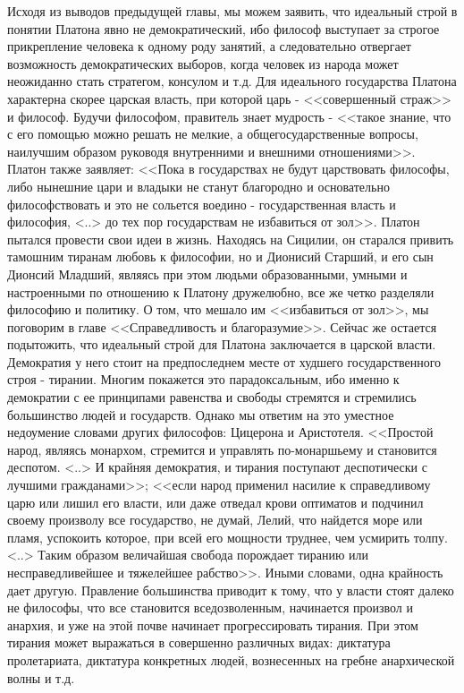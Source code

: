 	Исходя из выводов предыдущей главы, мы можем заявить, что идеальный строй 
	в понятии Платона явно не демократический, ибо философ выступает за 
	строгое прикрепление человека к одному роду занятий, а следовательно 
	отвергает возможность демократических выборов, когда человек из народа 
	может неожиданно стать стратегом, консулом и т.д. Для идеального 
	государства Платона характерна скорее царская власть, при которой 
	царь - <<совершенный страж>> и философ. Будучи философом, правитель знает 
	мудрость - <<такое знание, что с его помощью можно решать не мелкие, а 
	общегосударственные вопросы, наилучшим образом руководя внутренними и 
	внешними отношениями>>. Платон также заявляет: <<Пока в государствах не 
	будут царствовать философы, либо нынешние цари и владыки не станут 
	благородно и основательно философствовать и это не сольется воедино - 
	государственная власть и философия, <..> до тех пор государствам не 
	избавиться от зол>>. Платон пытался провести свои идеи в жизнь. 
	Находясь на Сицилии, он старался привить тамошним тиранам любовь к 
	философии, но и Дионисий Старший, и его сын Дионсий Младший, являясь 
	при этом людьми образованными, умными и настроенными по отношению к 
	Платону дружелюбно, все же четко разделяли философию и политику. О том, 
	что мешало им <<избавиться от зол>>, мы поговорим в главе <<Справедливость 
	и благоразумие>>. Сейчас же остается подытожить, что идеальный строй для 
	Платона заключается в царской власти. Демократия у него стоит на 
	предпоследнем месте от худшего государственного строя - тирании. Многим 
	покажется это парадоксальным, ибо именно к демократии с ее принципами 
	равенства и свободы стремятся и стремились большинство людей и государств. 
	Однако мы ответим на это уместное недоумение словами других философов: 
	Цицерона и Аристотеля. <<Простой народ, являясь монархом, стремится и 
	управлять по-монаршьему и становится деспотом. <..> И крайняя демократия, 
	и тирания поступают деспотически с лучшими гражданами>>; <<если народ 
	применил насилие к справедливому царю или лишил его власти, или даже 
	отведал крови оптиматов и подчинил своему произволу все государство, 
	не думай, Лелий, что найдется море или пламя, успокоить которое, при 
	всей его мощности труднее, чем усмирить толпу. <..> Таким образом 
	величайшая свобода порождает тиранию или несправедливейшее и тяжелейшее 
	рабство>>. Иными словами, одна крайность дает другую. Правление большинства 
	приводит к тому, что у власти стоят далеко не философы, что все становится 
	вседозволенным, начинается произвол и анархия, и уже на этой почве 
	начинает прогрессировать тирания. При этом тирания может выражаться в 
	совершенно различных видах: диктатура пролетариата, диктатура конкретных 
	людей, вознесенных на гребне анархической волны и т.д.

